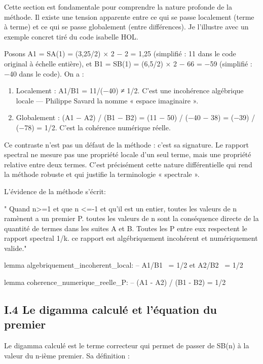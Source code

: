 \documentclass[11pt,a4paper]{article}
\begin{document}
Cette section est fondamentale pour comprendre la nature profonde de la méthode. Il existe une tension apparente entre ce qui se passe localement (terme à terme) et ce qui se passe globalement (entre différences). Je l'illustre avec un exemple concret tiré du code isabelle HOL.

Posons A1 = SA(1) = (3,25/2) × 2 − 2 = 1,25 (simplifié : 11 dans le code original à échelle entière), et B1 = SB(1) = (6,5/2) × 2 − 66 = −59 (simplifié : −40 dans le code). On a :

\begin{enumerate}[leftmargin=*]
\item Localement : A1/B1 = 11/(−40) ≠ 1/2. C'est une incohérence algébrique locale — Philippe Savard la nomme « espace imaginaire ».
\item Globalement : (A1 − A2) / (B1 − B2) = (11 − 50) / (−40 − 38) = (−39) / (−78) = 1/2. C'est la cohérence numérique réelle.
\end{enumerate}
Ce contraste n'est pas un défaut de la méthode : c'est sa signature. Le rapport spectral ne mesure pas une propriété locale d'un seul terme, mais une propriété relative entre deux termes. C'est précisément cette nature différentielle qui rend la méthode robuste et qui justifie la terminologie « spectrale ».

L'évidence de la méthode s'écrit:

" Quand n>=1 et que n <=-1 et qu'il est un entier, toutes les valeurs de n ramènent a un premier P. toutes les valeurs de n sont la conséquence directe de la quantité de termes dans les suites A et B. Toutes les P entre eux respectent le rapport spectral 1/k. ce rapport est algébriquement incohérent et numériquement valide."

\begin{holcode}[title={Code HOL — Contraste local/global}]
lemma algebriquement_incoherent_local:
 -- A1/B1 ~= 1/2 et A2/B2 ~= 1/2

lemma coherence_numerique_reelle_P:
 -- (A1 - A2) / (B1 - B2) = 1/2
\end{holcode}

\subsection{I.4 Le digamma calculé et l'équation du premier}

Le digamma calculé est le terme correcteur qui permet de passer de SB(n) à la valeur du n-ième premier. Sa définition :
\end{document}
